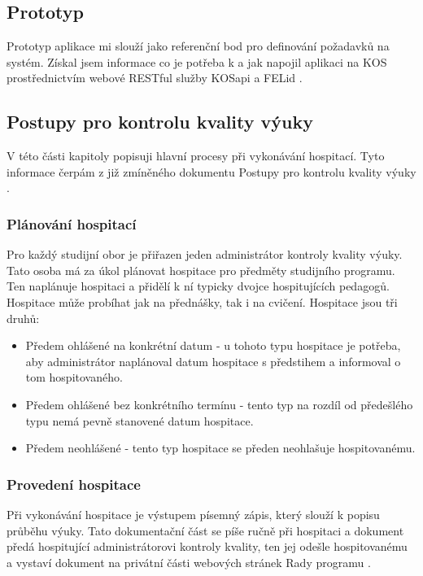 \subsection{Prototyp}
Prototyp aplikace \cite{prototyp_documentace} mi slouží jako referenční bod pro definování požadavků na systém. Získal jsem informace co je potřeba k a jak napojil aplikaci na KOS prostřednictvím webové RESTful služby KOSapi \cite{kosapi} a FELid \cite{felid}.

\subsection{Postupy pro kontrolu kvality výuky}
V této části kapitoly popisuji hlavní procesy při vykonávání hospitací. Tyto informace čerpám z již zmíněného dokumentu Postupy pro kontrolu kvality výuky \cite{postupy}.

\subsubsection{Plánování hospitací}
Pro každý studijní obor je přiřazen jeden administrátor kontroly kvality výuky. Tato osoba má za úkol plánovat hospitace pro předměty studijního programu. Ten naplánuje hospitaci a přidělí k ní typicky dvojce hospitujících pedagogů. Hospitace může probíhat jak na přednášky, tak i na cvičení. Hospitace jsou tři druhů:

\begin{itemize}
\item Předem ohlášené na konkrétní datum - u tohoto typu hospitace je potřeba, aby administrátor naplánoval datum hospitace s předstihem a informoval o tom hospitovaného.
\item Předem ohlášené bez konkrétního termínu - tento typ na rozdíl od předešlého typu nemá pevně stanovené datum hospitace. 
\item Předem neohlášené - tento typ hospitace se předen neohlašuje hospitovanému. 
\end{itemize}

\subsubsection{Provedení hospitace}
Při vykonávání hospitace je výstupem písemný zápis, který slouží k popisu průběhu výuky. Tato dokumentační část se píše ručně při hospitaci a dokument předá hospitující administrátorovi kontroly kvality, ten jej odešle hospitovanému a vystaví dokument na privátní části webových stránek Rady programu \cite{kvalitavyukyweb}.


